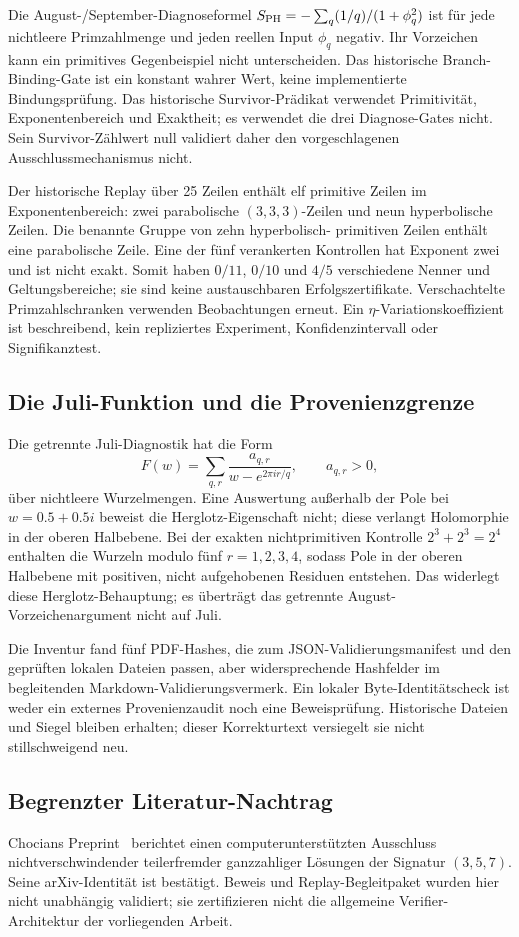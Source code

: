 \documentclass[11pt,a4paper]{article}
\begin{document}
Die August-/September-Diagnoseformel
$S_{\rm PH}=-\sum_q (1/q)/(1+\phi_q^2)$ ist für jede nichtleere
Primzahlmenge und jeden reellen Input $\phi_q$ negativ.
Ihr Vorzeichen kann ein primitives Gegenbeispiel nicht unterscheiden.
Das historische Branch-Binding-Gate ist ein konstant wahrer Wert,
keine implementierte Bindungsprüfung.
Das historische Survivor-Prädikat verwendet Primitivität,
Exponentenbereich und Exaktheit; es verwendet die drei Diagnose-Gates
nicht. Sein Survivor-Zählwert null validiert daher den vorgeschlagenen
Ausschlussmechanismus nicht.

Der historische Replay über 25 Zeilen enthält elf primitive Zeilen
im Exponentenbereich: zwei parabolische $(3,3,3)$-Zeilen und neun
hyperbolische Zeilen. Die benannte Gruppe von zehn hyperbolisch-
primitiven Zeilen enthält eine parabolische Zeile.
Eine der fünf verankerten Kontrollen hat Exponent zwei und ist
nicht exakt. Somit haben $0/11$, $0/10$ und $4/5$ verschiedene
Nenner und Geltungsbereiche; sie sind keine austauschbaren
Erfolgszertifikate. Verschachtelte Primzahlschranken verwenden
Beobachtungen erneut. Ein $\eta$-Variationskoeffizient ist
beschreibend, kein repliziertes Experiment, Konfidenzintervall
oder Signifikanztest.

\subsection{Die Juli-Funktion und die Provenienzgrenze}
Die getrennte Juli-Diagnostik hat die Form
\[
 F(w)=\sum_{q,r}\frac{a_{q,r}}{w-e^{2\pi i r/q}},
 \qquad a_{q,r}>0,
\]
über nichtleere Wurzelmengen. Eine Auswertung außerhalb der Pole
bei $w=0.5+0.5i$ beweist die Herglotz-Eigenschaft nicht;
diese verlangt Holomorphie in der oberen Halbebene.
Bei der exakten nichtprimitiven Kontrolle $2^3+2^3=2^4$ enthalten
die Wurzeln modulo fünf $r=1,2,3,4$, sodass Pole in der oberen
Halbebene mit positiven, nicht aufgehobenen Residuen entstehen.
Das widerlegt diese Herglotz-Behauptung; es überträgt das getrennte
August-Vorzeichenargument nicht auf Juli.

Die Inventur fand fünf PDF-Hashes, die zum JSON-Validierungsmanifest
und den geprüften lokalen Dateien passen, aber widersprechende
Hashfelder im begleitenden Markdown-Validierungsvermerk.
Ein lokaler Byte-Identitätscheck ist weder ein externes
Provenienzaudit noch eine Beweisprüfung. Historische Dateien
und Siegel bleiben erhalten; dieser Korrekturtext versiegelt
sie nicht stillschweigend neu.

\subsection{Begrenzter Literatur-Nachtrag}
Chocians Preprint~\cite{Chocian2026} berichtet einen
computerunterstützten Ausschluss nichtverschwindender teilerfremder
ganzzahliger Lösungen der Signatur $(3,5,7)$.
Seine arXiv-Identität ist bestätigt. Beweis und Replay-Begleitpaket
wurden hier nicht unabhängig validiert; sie zertifizieren nicht
die allgemeine Verifier-Architektur der vorliegenden Arbeit.
\end{document}
